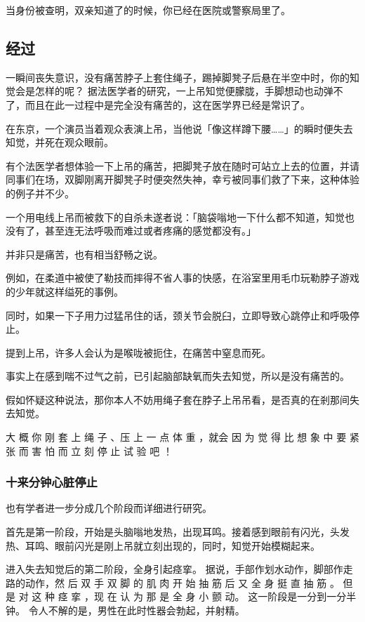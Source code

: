 \documentclass[UTF8]{ctexart}
\begin{document}
当身份被查明，双亲知道了的时候，你已经在医院或警察局里了。

\subsection{经过}

一瞬间丧失意识，没有痛苦脖子上套住绳子，踢掉脚凳子后悬在半空中时，你的知觉会是怎样的呢？
据法医学者的研究，一上吊知觉便朦胧，手脚想动也动弹不了，而且在此一过程中是完全没有痛苦的，这在医学界已经是常识了。

在东京，一个演员当着观众表演上吊，当他说「像这样蹲下腰……」的瞬时便失去知觉，并死在观众眼前。

有个法医学者想体验一下上吊的痛苦，把脚凳子放在随时可站立上去的位置，并请同事们在场，双脚刚离开脚凳子时便突然失神，幸亏被同事们救了下来，这种体验的例子并不少。

一个用电线上吊而被救下的自杀未遂者说：「脑袋嗡地一下什么都不知道，知觉也没有了，甚至连无法呼吸而难过或者疼痛的感觉都没有。」

并非只是痛苦，也有相当舒畅之说。

例如，在柔道中被使了勒技而摔得不省人事的快感，在浴室里用毛巾玩勒脖子游戏的少年就这样缢死的事例。

同时，如果一下子用力过猛吊住的话，颈关节会脱臼，立即导致心跳停止和呼吸停止。

提到上吊，许多人会认为是喉咙被扼住，在痛苦中窒息而死。

事实上在感到喘不过气之前，已引起脑部缺氧而失去知觉，所以是没有痛苦的。

假如怀疑这种说法，那你本人不妨用绳子套在脖子上吊吊看，是否真的在剎那间失去知觉。

大 概 你 刚 套 上 绳 子 、压 上 一 点 体 重 ，就会 因 为 觉 得 比 想 象 中 要 紧 张 而 害 怕 而 立 刻 停 止 试 验 吧 ！ 

\subsubsection*{十来分钟心脏停止}

也有学者进一步分成几个阶段而详细进行研究。

首先是第一阶段，开始是头脑嗡地发热，出现耳鸣。接着感到眼前有闪光，头发热、耳鸣、眼前闪光是刚上吊就立刻出现的，同时，知觉开始模糊起来。

进入失去知觉后的第二阶段，全身引起痉挛。
据说，手部作划水动作，脚部作走路的动作，然 后 双 手 双 脚 的 肌 肉 开 始 抽 筋 后 又 全 身 挺 直 抽 筋 。
但是 对 这 种 痉 挛 ，现 在 认 为 那 是 全 身 小 颤 动。
这一阶段是一分到一分半钟。
令人不解的是，男性在此时性器会勃起，并射精。
\end{document}
